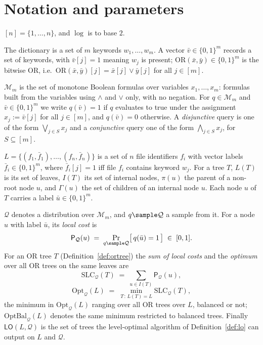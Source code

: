 \documentclass{conjura-conjecture}
\newcommand{\bits}{\{0,1\}}
\newcommand{\Qd}{\mathcal{Q}}
\newcommand{\Mon}{\mathcal{M}}
\newcommand{\ORv}{\mathrm{OR}}
\newcommand{\Pcost}{\mathsf{P}}
\newcommand{\SLC}{\mathrm{SLC}}
\newcommand{\Opt}{\mathrm{Opt}}
\newcommand{\OptBal}{\mathrm{OptBal}}
\newcommand{\LO}{\mathsf{LO}}
\begin{document}
\section{Notation and parameters}\label{sec:notation}

$[n] = \{1,\dots,n\}$, and $\log$ is to base $2$.

The dictionary is a set of $m$ keywords $w_1,\dots,w_m$. A vector
$\bar v \in \bits^m$ records a set of keywords, with $\bar v[j] = 1$
meaning $w_j$ is present; $\ORv(\bar x,\bar y) \in \bits^m$ is the bitwise
OR, i.e.\ $\ORv(\bar x,\bar y)[j] = \bar x[j] \vee \bar y[j]$ for all
$j \in [m]$.

$\Mon_m$ is the set of monotone Boolean formulas over variables
$x_1,\dots,x_m$: formulas built from the variables using $\wedge$ and
$\vee$ only, with no negation. For $q \in \Mon_m$ and
$\bar v \in \bits^m$ we write $q(\bar v) = 1$ if $q$ evaluates to true
under the assignment $x_j := \bar v[j]$ for all $j \in [m]$, and
$q(\bar v) = 0$ otherwise. A \emph{disjunctive} query is one of the form
$\bigvee_{j \in S} x_j$ and a \emph{conjunctive} query one of the form
$\bigwedge_{j \in S} x_j$, for $S \subseteq [m]$.

$L = \{(f_1,\bar f_1),\dots,(f_n,\bar f_n)\}$ is a set of $n$ file
identifiers $f_i$ with vector labels $\bar f_i \in \bits^m$, where
$\bar f_i[j] = 1$ iff file $f_i$ contains keyword $w_j$. For a tree $T$,
$L(T)$ is its set of leaves, $I(T)$ its set of internal nodes, $\pi(u)$ the
parent of a non-root node $u$, and $\Gamma(u)$ the set of children of an
internal node $u$. Each node $u$ of $T$ carries a label
$\bar u \in \bits^m$.

$\Qd$ denotes a distribution over $\Mon_m$, and $q \sample \Qd$ a sample
from it. For a node $u$ with label $\bar u$, its \emph{local cost} is
\[
  \Pcost_{\Qd}(u) \;=\; \Pr_{q \sample \Qd}\bigl[\,q(\bar u) = 1\,\bigr]
  \;\in\; [0,1].
\]
For an OR tree $T$ (Definition~\ref{def:ortree}) the \emph{sum of local
costs} and the \emph{optimum} over all OR trees on the same leaves are
\[
  \SLC_{\Qd}(T) \;=\; \sum_{u \in I(T)} \Pcost_{\Qd}(u),
\]
\[
  \Opt_{\Qd}(L) \;=\; \min_{T \,:\, L(T) = L} \SLC_{\Qd}(T),
\]
the minimum in $\Opt_{\Qd}(L)$ ranging over all OR trees over $L$, balanced
or not; $\OptBal_{\Qd}(L)$ denotes the same minimum restricted to balanced
trees. Finally $\LO(L,\Qd)$ is the set of trees the level-optimal algorithm
of Definition~\ref{def:lo} can output on $L$ and $\Qd$.
\end{document}
